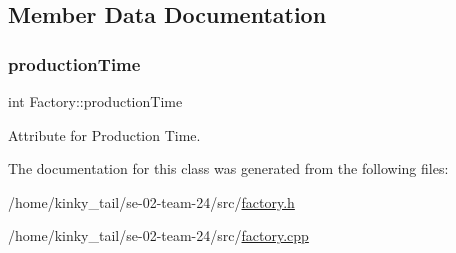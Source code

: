 \subsection{Member Data Documentation}
\mbox{\label{class_factory_ab3a36b3ceb997d9e3fcc534c45fef354}} 
\subsubsection{\texorpdfstring{production\+Time}{productionTime}}
{\footnotesize\ttfamily int Factory\+::production\+Time\hspace{0.3cm}{\ttfamily [private]}}



Attribute for Production Time. 



The documentation for this class was generated from the following files\+:\begin{DoxyCompactItemize}
\item 
/home/kinky\+\_\+tail/se-\/02-\/team-\/24/src/\hyperlink{factory_8h}{factory.\+h}\item 
/home/kinky\+\_\+tail/se-\/02-\/team-\/24/src/\hyperlink{factory_8cpp}{factory.\+cpp}\end{DoxyCompactItemize}
